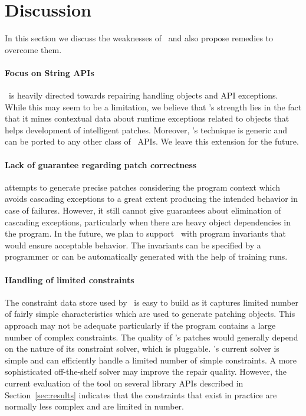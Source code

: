\section{Discussion}
\label{sec:discussion}

In this section we discuss the weaknesses of \tool\ and also propose
remedies to overcome them.

\paragraph{Focus on String APIs} \tool\ is heavily directed towards repairing 
handling  objects and API
exceptions. While this may seem to be a limitation, we believe that \tool's
strength lies in the fact that it mines contextual data about runtime exceptions
related to  objects that helps development of intelligent patches.
Moreover, \tool's technique is generic and can be ported to any other class of
\java\ APIs. We leave this extension for the future.

\paragraph{Lack of guarantee regarding patch correctness} \tool attempts to generate 
precise patches considering the program context which avoids
cascading exceptions to a great extent producing the intended behavior in case
of failures. However, it still cannot give guarantees about elimination of cascading
exceptions, particularly when there are heavy object dependencies in the program.
In the future, we plan to support \tool\ with program invariants that would ensure 
acceptable behavior. The invariants can be specified by a programmer or can be
automatically generated with the help of training runs.

\paragraph{Handling of limited constraints} The constraint data store used by \tool\
is easy to build as it captures
limited number of fairly simple  characteristics which are used to
generate patching \code{String} objects. This approach may not be adequate particularly
if the program contains a large number of complex constraints. The quality of
\tool's patches would generally depend on the nature of its constraint solver,
which is pluggable. \tool's current solver is simple and can efficiently
handle a limited number of simple constraints. A more sophisticated off-the-shelf solver may improve
the repair quality. However, the current evaluation of the tool
on several library APIs described in Section~\ref{sec:results} indicates that the constraints that exist
in practice are normally less complex and are limited in number. \note{Please check this section.}


